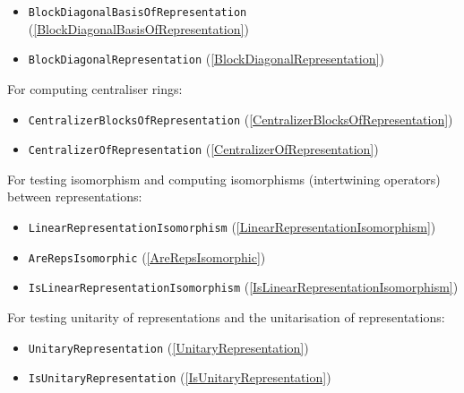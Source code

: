 \documentclass[a4paper,11pt]{report}
\begin{document}
{{{ 
\begin{itemize}
\item  \texttt{BlockDiagonalBasisOfRepresentation} (\ref{BlockDiagonalBasisOfRepresentation}) 
\item  \texttt{BlockDiagonalRepresentation} (\ref{BlockDiagonalRepresentation}) 
\end{itemize}
 

 For computing centraliser rings: 

 
\begin{itemize}
\item  \texttt{CentralizerBlocksOfRepresentation} (\ref{CentralizerBlocksOfRepresentation}) 
\item  \texttt{CentralizerOfRepresentation} (\ref{CentralizerOfRepresentation}) 
\end{itemize}
 

 For testing isomorphism and computing isomorphisms (intertwining operators)
between representations: 

 
\begin{itemize}
\item  \texttt{LinearRepresentationIsomorphism} (\ref{LinearRepresentationIsomorphism}) 
\item  \texttt{AreRepsIsomorphic} (\ref{AreRepsIsomorphic}) 
\item  \texttt{IsLinearRepresentationIsomorphism} (\ref{IsLinearRepresentationIsomorphism}) 
\end{itemize}
 

 For testing unitarity of representations and the unitarisation of
representations: 

 
\begin{itemize}
\item  \texttt{UnitaryRepresentation} (\ref{UnitaryRepresentation}) 
\item  \texttt{IsUnitaryRepresentation} (\ref{IsUnitaryRepresentation}) 
\end{itemize}
 }

 }

 }

   
\end{document}
